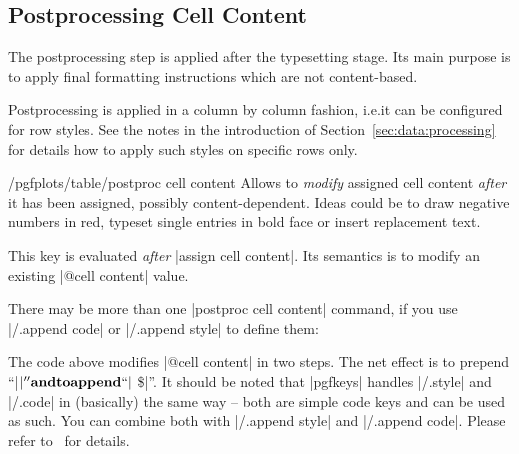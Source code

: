 \subsection{Postprocessing Cell Content}

The postprocessing step is applied after the typesetting stage. Its main
purpose is to apply final formatting instructions which are not content-based.

Postprocessing is applied in a column by column fashion, i.e.\@ it can be
configured for row styles. See the notes in the introduction of
Section~\ref{sec:data:processing} for details how to apply such styles on
specific rows only.

\begin{codekey}{/pgfplots/table/postproc cell content}
    Allows to \emph{modify} assigned cell content \emph{after} it has been
    assigned, possibly content-dependent. Ideas could be to draw negative
    numbers in red, typeset single entries in bold face or insert replacement
    text.

    This key is evaluated \emph{after} |assign cell content|. Its semantics is
    to modify an existing |@cell content| value.

    There may be more than one |postproc cell content| command, if you use
    |/.append code| or |/.append style| to define them:
\begin{codeexample}[pre={\begin{lateximage}},post={\end{lateximage}}]
\end{codeexample}
    The code above modifies |@cell content| in two steps. The net effect is to
    prepend ``|$\bf |'' and to append ``|$ \$|''. It should be noted that
    |pgfkeys| handles |/.style| and |/.code| in (basically) the same way --
    both are simple code keys and can be used as such. You can combine both
    with |/.append style| and |/.append code|. Please refer to~\cite[section
    about pgfkeys]{tikz} for details.


\end{codekey}
